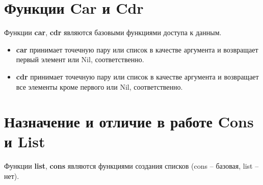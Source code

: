 \documentclass[a4paper,14pt, unknownkeysallowed]{extreport}
\begin{document}
\section{Функции Car и Cdr}

Функции \textbf{car}, \textbf{cdr} являются базовыми функциями доступа к данным. 

\begin{itemize}
	\item \textbf{car} принимает точечную пару или список в качестве аргумента и возвращает первый элемент или Nil, соответственно. 
	\item \textbf{cdr} принимает точечную пару или список в качестве аргумента и возвращает все элементы кроме первого или Nil, соответственно.
\end{itemize}

\section{Назначение и отличие в работе Cons и List}

Функции \textbf{list}, \textbf{cons} являются функциями создания списков (cons – базовая, list – нет). 
\end{document}

